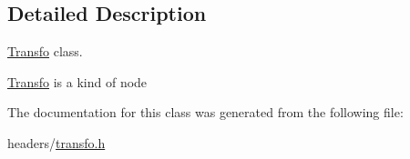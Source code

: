 \subsection{\-Detailed \-Description}
\hyperlink{class_transfo}{\-Transfo} class. 

\hyperlink{class_transfo}{\-Transfo} is a kind of node 

\-The documentation for this class was generated from the following file\-:\begin{DoxyCompactItemize}
\item 
headers/\hyperlink{transfo_8h}{transfo.\-h}\end{DoxyCompactItemize}
